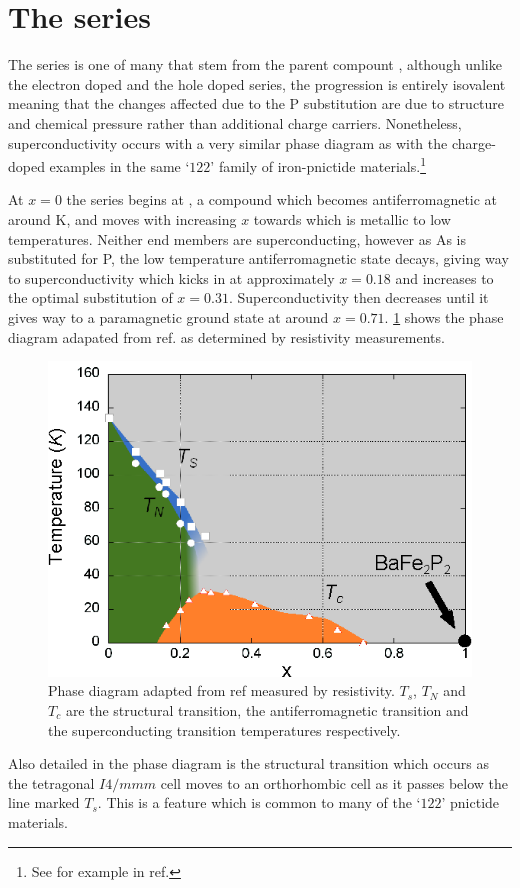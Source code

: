 
\section{The \BaFePAs series}

The \BaFePAs series is one of many that stem from the parent compount \BaFeAs, although unlike the electron doped \BaCoFeAs and the hole doped \BaKFeAs series, the \BaFePAs progression is entirely isovalent meaning that the changes affected due to the P substitution are due to structure and chemical pressure rather than additional charge carriers. Nonetheless, superconductivity occurs with a very similar phase diagram as with the charge-doped examples in the same `$122$' family of iron-pnictide materials.\footnote{See for example  in ref.\cite{Paglione2010}}

At $x=0$ the \BaFePAs series begins at \BaFeAs, a compound which becomes antiferromagnetic at around \unit[138]{K}, and moves with increasing $x$ towards \BaFeP which is metallic to low temperatures. Neither end members are superconducting, however as As is substituted for P, the low temperature antiferromagnetic state decays, giving way to superconductivity which kicks in at approximately $x=0.18$ and increases to the optimal substitution of $x=0.31$. Superconductivity then decreases until it gives way to a paramagnetic ground state at around $x=0.71$. \Fig\ref{Fig:3:PhaseDiagram} shows the phase diagram adapated from ref. \cite{Nakai2010a} as determined by resistivity measurements. 
\begin{figure}[htbp]
    \begin{center}
        \includegraphics[scale=1.0]{Chapter3-dHvABaFe2P2/Figures/BaFe2P2Series/PhaseDiagram/PhaseDiagram}
        \caption{Phase diagram adapted from ref \cite{Nakai2010a} measured by resistivity. $T_s$, $T_N$ and $T_c$ are the structural transition, the antiferromagnetic transition and the superconducting transition temperatures respectively.}
        \label{Fig:3:PhaseDiagram}
    \end{center}
\end{figure}
Also detailed in the phase diagram is the structural transition which occurs as the tetragonal $I4/mmm$ cell moves to an orthorhombic cell as it passes below the line marked $T_s$. This is a feature which is common to many of the `$122$' pnictide materials.


